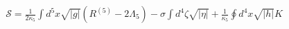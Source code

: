 \documentclass[preview]{standalone}
\begin{document}
\begin{align*}
\mathcal{S}= \frac{1}{2 \kappa_{5}} \int d^{5} x \sqrt{|g|}\left(R^{(5)}-2 \Lambda_{5}\right) - \sigma \int d^{4} \zeta \sqrt{|\eta|} + \frac{1}{\kappa_{5}} \oint d^{4} x \sqrt{|h|} K
\end{align*}
\end{document}

